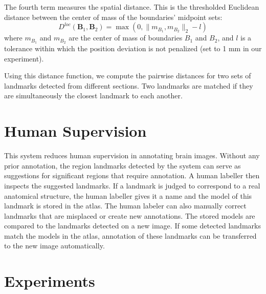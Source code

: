 \documentclass{llncs}
\begin{document}
The fourth term measures the spatial distance. This is the thresholded Euclidean distance between the center of mass of the boundaries' midpoint sets:
$$D^{loc}(\mathbf{B}_1, \mathbf{B}_2) = \max(0, \| m_{B_1}, m_{B_2} \|_2 - l)$$
where $m_{B_1}$ and $m_{B_2}$ are the center of mass of boundaries $B_1$ and $B_2$, and $l$ is a tolerance within which the position deviation is not penalized (set to 1 mm in our experiment).



Using this distance function, we compute the pairwise distances for two sets of landmarks detected from different sections. Two landmarks are matched if they are simultaneously the closest landmark to each another.

\section{Human Supervision}

This system reduces human supervision in annotating brain images. Without any prior annotation, the region landmarks detected by the system can serve as suggestions for significant regions that require annotation. A human labeller then inspects the suggested landmarks. If a landmark is judged to correspond to a real anatomical structure, the human labeller gives it a name and the model of this landmark is stored in the atlas. The human labeler can also manually correct landmarks that are misplaced or create new annotations.
The stored models are compared to the landmarks detected on a new image. If some detected landmarks match the models in the atlas, annotation of these landmarks can be transferred to the new image automatically.



\section{Experiments}
\end{document}
